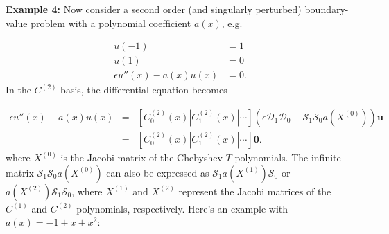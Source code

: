 \documentclass[12pt,a4paper]{article}
\begin{document}
\textbf{Example 4:} Now consider a second order (and singularly perturbed) boundary-value problem with a polynomial coefficient $a(x)$, e.g.


\begin{align*}
u(-1) &= 1\\
u(1) &= 0\\
\epsilon u''(x) - a(x)u(x) &= 0.
\end{align*}
In the $C^{(2)}$ basis, the differential equation becomes


\begin{eqnarray*}
\epsilon u''(x) - a(x)u(x)  &=& \left[ C_0^{(2)}(x) | C_1^{(2)}(x) | \cdots \right]\left(\epsilon\mathcal{D}_1\mathcal{D}_0  - \mathcal{S}_1\mathcal{S}_0a(X^{(0)})  \right) \mathbf{u} \\
 &=& \left[ C_0^{(2)}(x) | C_1^{(2)}(x) | \cdots \right]\mathbf{0}.
 \end{eqnarray*}
where $X^{(0)}$ is the Jacobi matrix of the Chebyshev $T$ polynomials. The infinite matrix $\mathcal{S}_1\mathcal{S}_0a(X^{(0)})$ can also be expressed as $\mathcal{S}_1a(X^{(1)})\mathcal{S}_0$ or $a(X^{(2)})\mathcal{S}_1\mathcal{S}_0$, where $X^{(1)}$ and $X^{(2)}$ represent the Jacobi matrices of the $C^{(1)}$ and $C^{(2)}$ polynomials, respectively.  Here's an example with $a(x) = -1 + x + x^2$:
\end{document}
